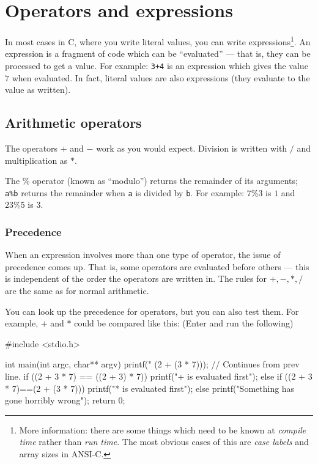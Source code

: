 
\chapter{Operators and expressions}


In most cases in C, where you write literal values, you can write expressions\footnote{More information:
there are some things which need to be known at \emph{compile time} rather than \emph{run time}.
The most obvious cases of this are \emph{case labels} and array sizes in ANSI-C.}.
An expression is a fragment of code which can be ``evaluated'' --- that is, they can be processed to get a value.
For example:
\texttt{3+4} is an expression which gives the value $7$ when evaluated.
In fact, literal values are also expressions (they evaluate to the value as written).

\section{Arithmetic operators}

The operators $+$ and $-$ work as you would expect.
Division is written with $/$ and multiplication as $*$.

The \% operator (known as ``modulo'') returns the remainder of its arguments;
\texttt{a\%b} returns the remainder when \texttt{a} is divided by \texttt{b}.
For example: $7\%3$ is $1$   and $23\%5$ is $3$.


\subsection{Precedence}
When an expression involves more than one type of operator, the issue of precedence comes up.
That is, some operators are evaluated before others --- this is independent of the order the operators are written in.
The rules for $+,-,*,/$ are the same as for normal arithmetic.

You can look up the precedence for operators, but you can also test them.
For example, $+$ and $*$ could be compared like this:
(Enter and run the following)
\begin{codeblock}
#include <stdio.h>

int main(int argc, char** argv) {
    printf("%
            (2 + (3 * 7))); // Continues from prev line.
    if ((2 + 3 * 7) == ((2 + 3) * 7)) {
        printf("+ is evaluated first\n");    
    } else if ((2 + 3 * 7)==(2 + (3 * 7))) {
        printf("* is evaluated first\n");
    } else {
        printf("Something has gone horribly wrong\n");
    }
    return 0;
}
\end{codeblock} 

